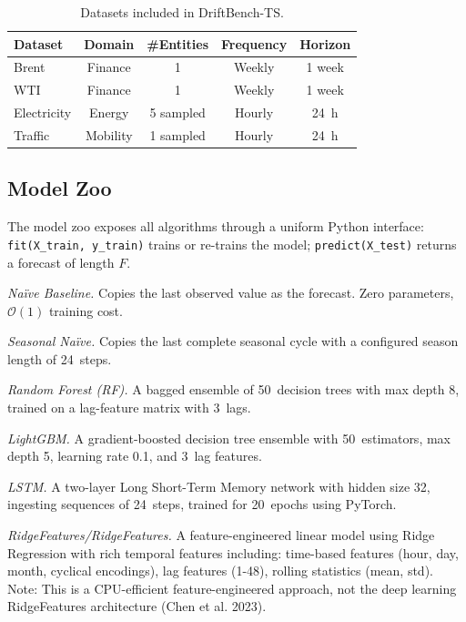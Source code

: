 \documentclass[conference]{IEEEtran}
\begin{document}
\begin{table}[t]
	\centering
	\caption{Datasets included in DriftBench-TS.}
	\label{tab:datasets}
	\begin{tabular}{lcccc}
		\toprule
		Dataset     & Domain   & \#Entities & Frequency & Horizon \\
		\midrule
		Brent       & Finance  & 1          & Weekly    & 1 week  \\
		WTI         & Finance  & 1          & Weekly    & 1 week  \\
		Electricity & Energy   & 5 sampled  & Hourly    & 24~h    \\
		Traffic     & Mobility & 1 sampled  & Hourly    & 24~h    \\
		\bottomrule
	\end{tabular}
\end{table}

\subsection{Model Zoo}

The model zoo exposes all algorithms through a uniform Python
interface: \texttt{fit(X\_train, y\_train)} trains or re-trains the
model; \texttt{predict(X\_test)} returns a forecast of length $F$.

\textit{Na\"{i}ve Baseline.} Copies the last observed value as the
forecast. Zero parameters, $\mathcal{O}(1)$ training cost.

\textit{Seasonal Na\"{i}ve.} Copies the last complete seasonal cycle
with a configured season length of 24~steps.

\textit{Random Forest (RF).} A bagged ensemble of 50~decision trees
with max depth 8, trained on a lag-feature matrix with 3~lags.

\textit{LightGBM.} A gradient-boosted decision tree ensemble with
50~estimators, max depth 5, learning rate 0.1, and 3~lag features.

\textit{LSTM.} A two-layer Long Short-Term Memory network with hidden
size 32, ingesting sequences of 24~steps, trained for 20~epochs using
PyTorch.

\textit{RidgeFeatures/RidgeFeatures.} A feature-engineered linear model using Ridge Regression with rich temporal features including: time-based features (hour, day, month, cyclical encodings), lag features (1-48), rolling statistics (mean, std). Note: This is a CPU-efficient feature-engineered approach, not the deep learning RidgeFeatures architecture (Chen et al. 2023).
\end{document}

